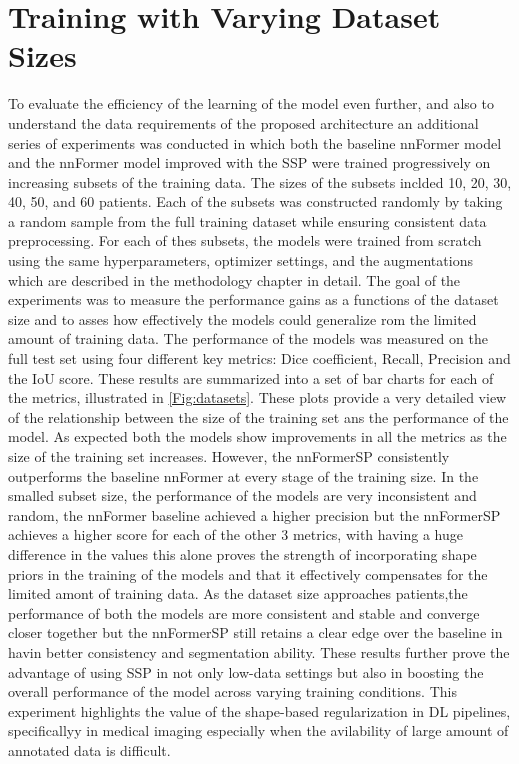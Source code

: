 \section{Training with Varying Dataset Sizes}
To evaluate the efficiency of the learning of the model even further, and also to understand the data requirements of the proposed architecture an additional series of experiments was conducted in which both the baseline nnFormer model and the nnFormer model improved with the SSP were trained progressively on increasing subsets of the training data. The sizes of the subsets inclded 10, 20, 30, 40, 50, and 60 patients. Each of the subsets was constructed randomly by taking a random sample from the full training dataset while ensuring consistent data preprocessing. For each of thes subsets, the models were trained from scratch using the same hyperparameters, optimizer settings, and the augmentations which are described in the methodology chapter in detail. The goal of the experiments was to measure the performance gains as a functions of the dataset size and to asses how effectively the models could generalize rom the limited amount of training data. The performance of the models was measured on the full test set using four different key metrics: Dice coefficient, Recall, Precision and the IoU score. These results are summarized into a set of bar charts for each of the metrics, illustrated in \cref{Fig:datasets}. These plots provide a very detailed view of the relationship between the size of the training set ans the performance of the model. As expected both the models show improvements in all the metrics as the size of the training set increases. However, the nnFormerSP consistently outperforms the baseline nnFormer at every stage of the training size. In the smalled subset size, the performance of the models are very inconsistent and random, the nnFormer baseline achieved a higher precision but the nnFormerSP achieves a higher score for each of the other 3 metrics, with having a huge difference in the values this alone proves the strength of incorporating shape priors in the training of the models and that it effectively compensates for the limited amont of training data. As the dataset size approaches  patients,the performance of both the models are more consistent and stable and converge closer together but the nnFormerSP still retains a clear edge over the baseline in havin better consistency and segmentation ability. These results further prove the advantage of using SSP in not only low-data settings but also in boosting the overall performance of the model across varying training conditions. This experiment highlights the value of the shape-based regularization in DL pipelines, specificallyy in medical imaging especially when the avilability of large amount of annotated data is difficult.

